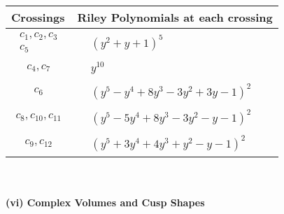 \documentclass[1p]{elsarticle_modified}
\theoremstyle{definition}
\begin{document}
\begin{tabular}{m{50pt}|m{274pt}}
Crossings & \hspace{64pt}Riley Polynomials at each crossing \\
\hline $$\begin{aligned}c_{1},c_{2},c_{3}\\c_{5}\end{aligned}$$&$\begin{aligned}
&(y^2+y+1)^5
\end{aligned}$\\
\hline $$\begin{aligned}c_{4},c_{7}\end{aligned}$$&$\begin{aligned}
&y^{10}
\end{aligned}$\\
\hline $$\begin{aligned}c_{6}\end{aligned}$$&$\begin{aligned}
&(y^5- y^4+8 y^3-3 y^2+3 y-1)^2
\end{aligned}$\\
\hline $$\begin{aligned}c_{8},c_{10},c_{11}\end{aligned}$$&$\begin{aligned}
&(y^5-5 y^4+8 y^3-3 y^2- y-1)^2
\end{aligned}$\\
\hline $$\begin{aligned}c_{9},c_{12}\end{aligned}$$&$\begin{aligned}
&(y^5+3 y^4+4 y^3+y^2- y-1)^2
\end{aligned}$\\
\hline
\end{tabular}\\~\\
\newpage\flushleft \textbf{(vi) Complex Volumes and Cusp Shapes}
\end{document}
